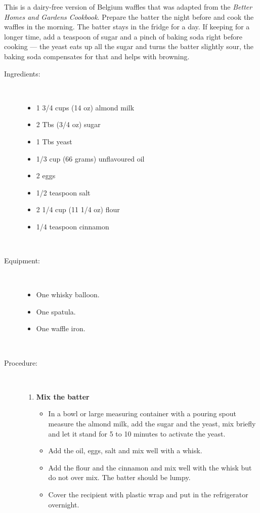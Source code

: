 \documentclass[11pt,letterpaper]{article}
\begin{document}



This is a dairy-free version of Belgium waffles that was adapted from the {\it Better Homes and Gardens Cookbook}. Prepare the batter the night before and cook the waffles in the morning. The batter stays in the fridge for a day. If keeping for a longer time, add a teaspoon of sugar and a pinch of baking soda right before cooking --- the yeast eats up all the sugar and turns the batter slightly sour, the baking soda compensates for that and helps with browning.

\begin{description}

\item[Ingredients:]\ \\
	\begin{itemize}
	\item 1 3/4 cups (14 oz) almond milk
	\item 2 Tbs (3/4 oz) sugar
	\item 1 Tbs yeast
	\item 1/3 cup (66 grams) unflavoured oil
	\item 2 eggs
	\item 1/2 teaspoon salt
	\item 2 1/4 cup (11 1/4 oz) flour
	\item 1/4 teaspoon cinnamon
	\end{itemize}

\ \\
\item[Equipment:]\ \\
\begin{itemize}
\item One whisky balloon.
\item One spatula.
\item One waffle iron.
\end{itemize}
\ \\


\item[Procedure:]\ \\

	\begin{enumerate}
	\item {\bf Mix the batter}
	\begin{itemize}
	\item In a bowl or large measuring container with a pouring spout measure the almond milk, add the sugar and the yeast, mix briefly and let it stand for 5 to 10 minutes to activate the yeast.
	\item Add the oil, eggs, salt and mix well with a whisk.
	\item Add the flour and the cinnamon and mix well with the whisk but do not over mix. The batter should be lumpy.
	\item Cover the recipient with plastic wrap and put in the refrigerator overnight.
	\end{itemize}


\end{enumerate}
\end{description}
\end{document}
